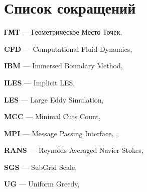 \newpage

\section*{Список сокращений}

\textbf{ГМТ} --- Геометрическое Место Точек, \pageref{abbr:gmt}

\textbf{CFD} --- Computational Fluid Dynamics, \pageref{abbr:cfd}

\textbf{IBM} --- Immersed Boundary Method, \pageref{abbr:ibm}

\textbf{ILES} --- Implicit LES, \pageref{abbr:iles}

\textbf{LES} --- Large Eddy Simulation, \pageref{abbr:les}

\textbf{MCC} --- Minimal Cuts Count, \pageref{abbr:mcc}

\textbf{MPI} --- Message Passing Interface, \pageref{abbr:mpi}, \pageref{abbr:mpi2}

\textbf{RANS} --- Reynolds Averaged Navier-Stokes, \pageref{abbr:rans}

\textbf{SGS} --- SubGrid Scale, \pageref{abbr:sgs}

\textbf{UG} --- Uniform Greedy, \pageref{abbr:ug}
